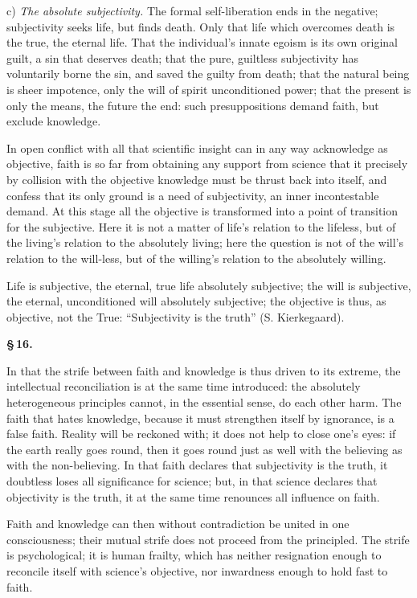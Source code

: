 \documentclass[12pt]{book}
\begin{document}
c) \emph{The absolute subjectivity.} The formal self-liberation ends in the negative;
subjectivity seeks life, but finds death. Only that life which overcomes death is the
true, the eternal life. That the individual's innate egoism is its own original guilt, a
sin that deserves death; that the pure, guiltless subjectivity has voluntarily borne the
sin, and saved the guilty from death; that the natural being is sheer impotence, only the
will of spirit unconditioned power; that the present is only the means, the future the
end: such presuppositions demand faith, but exclude knowledge.

In open conflict with all that scientific insight can in any way acknowledge as objective,
faith is so far from obtaining any support from science that it precisely by collision
with the objective
knowledge must be thrust back into itself, and confess that its only ground is a need of
subjectivity, an inner incontestable demand. At this stage all the objective is
transformed into a point of transition for the subjective. Here it is not a matter of
life's relation to the lifeless, but of the living's relation to the absolutely living;
here the question is not of the will's relation to the will-less, but of the willing's
relation to the absolutely willing.

Life is subjective, the eternal, true life absolutely subjective; the will is subjective,
the eternal, unconditioned will absolutely subjective; the objective is thus, as objective,
not the True: ``Subjectivity is the truth'' (S. Kierkegaard).

\begin{center}{\bfseries \S\,16.}\end{center}

In that the strife between faith and knowledge is thus driven to its extreme, the
intellectual reconciliation is at the same time introduced: the absolutely heterogeneous
principles cannot, in the essential sense, do each other harm. The faith that hates
knowledge, because it must strengthen itself by ignorance, is a false faith. Reality will
be reckoned with; it does not help to close one's eyes: if the earth really goes round,
then it goes round just as well with the believing as with the non-believing. In that
faith declares that subjectivity is the truth, it doubtless loses all significance for
science; but, in that science declares that objectivity is the truth, it at the same time
renounces all influence on faith.

Faith and knowledge can then without contradiction be united in one consciousness; their
mutual strife does not proceed from the principled. The strife is psychological; it is
human frailty, which has neither resignation enough to reconcile itself with science's
objective, nor inwardness enough to hold fast to faith.
\end{document}
